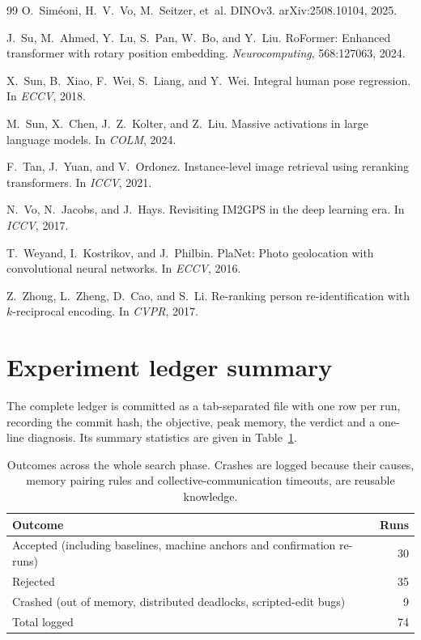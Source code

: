 \documentclass[11pt,a4paper]{article}
\begin{document}
\begin{thebibliography}{99}
O.~Sim\'eoni, H.~V.~Vo, M.~Seitzer, et~al.
\newblock DINOv3.
\newblock arXiv:2508.10104, 2025.

J.~Su, M.~Ahmed, Y.~Lu, S.~Pan, W.~Bo, and Y.~Liu.
\newblock RoFormer: Enhanced transformer with rotary position embedding.
\newblock \emph{Neurocomputing}, 568:127063, 2024.

X.~Sun, B.~Xiao, F.~Wei, S.~Liang, and Y.~Wei.
\newblock Integral human pose regression.
\newblock In \emph{ECCV}, 2018.

M.~Sun, X.~Chen, J.~Z.~Kolter, and Z.~Liu.
\newblock Massive activations in large language models.
\newblock In \emph{COLM}, 2024.

F.~Tan, J.~Yuan, and V.~Ordonez.
\newblock Instance-level image retrieval using reranking transformers.
\newblock In \emph{ICCV}, 2021.

N.~Vo, N.~Jacobs, and J.~Hays.
\newblock Revisiting IM2GPS in the deep learning era.
\newblock In \emph{ICCV}, 2017.

T.~Weyand, I.~Kostrikov, and J.~Philbin.
\newblock PlaNet: Photo geolocation with convolutional neural networks.
\newblock In \emph{ECCV}, 2016.

Z.~Zhong, L.~Zheng, D.~Cao, and S.~Li.
\newblock Re-ranking person re-identification with $k$-reciprocal encoding.
\newblock In \emph{CVPR}, 2017.

\end{thebibliography}

\appendix

\section{Experiment ledger summary}

The complete ledger is committed as a tab-separated file with one row per run, recording the
commit hash, the objective, peak memory, the verdict and a one-line diagnosis. Its summary
statistics are given in Table~\ref{tab:ledger}.

\begin{table}[h]
\centering
\small
\begin{tabular}{lr}
\toprule
Outcome & Runs \\
\midrule
Accepted (including baselines, machine anchors and confirmation re-runs) & 30 \\
Rejected & 35 \\
Crashed (out of memory, distributed deadlocks, scripted-edit bugs) & 9 \\
\midrule
Total logged & 74 \\
\bottomrule
\end{tabular}
\caption{Outcomes across the whole search phase. Crashes are logged because their
causes, memory pairing rules and collective-communication timeouts, are reusable knowledge.}
\label{tab:ledger}
\end{table}
\end{document}
